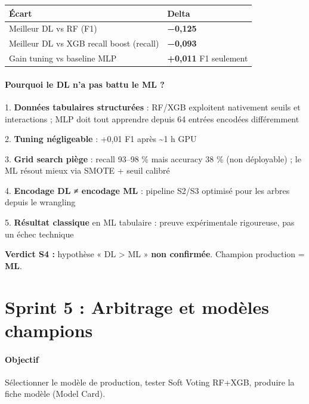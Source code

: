\documentclass[11pt,a4paper]{report}
\begin{document}
\begin{longtable}{@{}ll@{}}
\toprule
Écart & Delta \\
\midrule
Meilleur DL vs RF (F1) & \textbf{−0,125} \\
Meilleur DL vs XGB recall boost (recall) & \textbf{−0,093} \\
Gain tuning vs baseline MLP & \textbf{+0,011} F1 seulement \\
\bottomrule
\end{longtable}




\subsubsection{Pourquoi le DL n'a pas battu le ML ?}



1. \textbf{Données tabulaires structurées} : RF/XGB exploitent nativement seuils et interactions ; MLP doit tout apprendre depuis 64 entrées encodées différemment

2. \textbf{Tuning négligeable} : +0,01 F1 après \textasciitilde{}1 h GPU

3. \textbf{Grid search piège} : recall 93–98 \% mais accuracy 38 \% (non déployable) ; le ML résout mieux via SMOTE + seuil calibré

4. \textbf{Encodage DL ≠ encodage ML} : pipeline S2/S3 optimisé pour les arbres depuis le wrangling

5. \textbf{Résultat classique} en ML tabulaire : preuve expérimentale rigoureuse, pas un échec technique



\textbf{Verdict S4 :} hypothèse « DL > ML » \textbf{non confirmée}. Champion production = \textbf{ML}.





\chapter{Sprint 5 : Arbitrage et modèles champions}



\subsubsection{Objectif}



Sélectionner le modèle de production, tester Soft Voting RF+XGB, produire la fiche modèle (Model Card).
\end{document}
